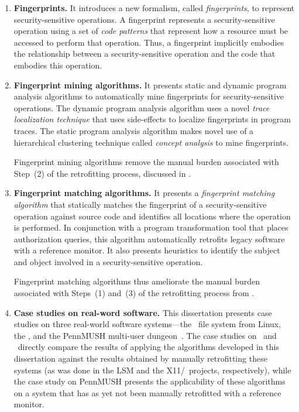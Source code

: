 \begin{enumerate}

\item \textbf{Fingerprints.} It introduces a new formalism, called
\textit{fingerprints}, to represent security-sensitive operations.  A
fingerprint represents a security-sensitive operation using a set of
\textit{code patterns} that represent how a resource must be accessed to
perform that operation. Thus, a fingerprint implicitly embodies the
relationship between a security-sensitive operation and the code that embodies
this operation.

\item \textbf{Fingerprint mining algorithms.} It presents static and dynamic
program analysis algorithms to automatically mine fingerprints for
security-sensitive operations. The dynamic program analysis algorithm uses a
novel \textit{trace localization technique} that uses side-effects to localize
fingerprints in program traces. The static program analysis algorithm makes
novel use of a hierarchical clustering technique called \textit{concept
analysis} to mine fingerprints.  

Fingerprint mining algorithms remove the manual burden associated with Step~(2)
of the retrofitting process, discussed in
.

\item \textbf{Fingerprint matching algorithms.} It presents a
\textit{fingerprint matching algorithm} that statically matches the fingerprint
of a security-sensitive operation against source code and identifies all
locations where the operation is performed. In conjunction with a program
transformation tool that places authorization queries, this algorithm
automatically retrofits legacy software with a reference monitor. It also
presents heuristics to identify the subject and object involved in a
security-sensitive operation. 

Fingerprint matching algorithms thus ameliorate the manual burden associated
with Steps~(1) and~(3) of the retrofitting process from
.

\item \textbf{Case studies on real-word software.} This dissertation presents
case studies on three real-world software systems---the \ext\ file system from
Linux, the \xserver, and the PennMUSH multi-user dungeon~\cite{games}. The case
studies on \ext\ and \xserver\ directly compare the results of applying the
algorithms developed in this dissertation against the results obtained by
manually retrofitting these systems (as was done in the LSM and the
X11/\selinux\ projects, respectively), while the case study on PennMUSH
presents the applicability of these algorithms on a system that has as yet not
been manually retrofitted with a reference monitor.

\end{enumerate}

